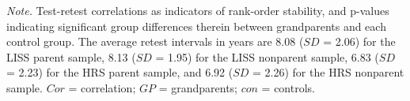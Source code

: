 \documentclass[
  english,
  man, noextraspace]{apa7}
\newenvironment{lltable}{\begin{landscape}\begin{center}\begin{ThreePartTable}}{\end{ThreePartTable}\end{center}\end{landscape}}
\begin{document}
\begin{appendix}
\begin{lltable}
{}

\end{lltable}













\begin{lltable}

\begin{TableNotes}[para]
\normalsize{\textit{Note.} Test-retest correlations as indicators of
rank-order stability, and p-values indicating significant group
differences therein between grandparents and each control group. The
average retest intervals in years are 8.08 (\(SD\) = 2.06) for the LISS
parent sample, 8.13 (\(SD\) = 1.95) for the LISS nonparent sample, 6.83
(\(SD\) = 2.23) for the HRS parent sample, and 6.92 (\(SD\) = 2.26) for
the HRS nonparent sample. \(Cor\) = correlation; \(GP\) = grandparents;
\(con\) = controls.}
\end{TableNotes}

\small{

}
\end{lltable}
\end{appendix}
\end{document}
